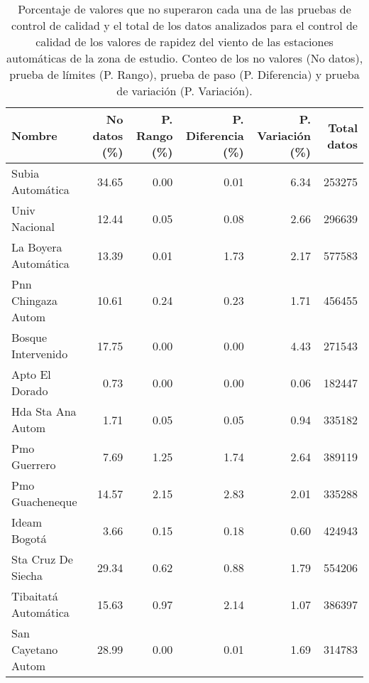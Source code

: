 \begin{table}[H]
\begin{center}

\caption{Porcentaje de valores que no superaron cada una de las pruebas de control de calidad y el total de los datos analizados para el control de calidad de los valores de rapidez del viento de las estaciones automáticas de la zona de estudio. Conteo de los no valores (No datos), prueba de límites (P. Rango), prueba de paso (P. Diferencia) y prueba de variación (P. Variación).}

\begin{tabular}{p{3cm}rrrrr}
\toprule
      Nombre &  No datos  (\%)&  P. Rango  (\%)&  P. Diferencia  (\%)&  P. Variación  (\%)& Total datos \\
\midrule
        Subia Automática &      34.65 &      0.00 &           0.01 &          6.34 &        253275 \\
           Univ Nacional &      12.44 &      0.05 &           0.08 &          2.66 &        296639 \\
    La Boyera Automática &      13.39 &      0.01 &           1.73 &          2.17 &        577583 \\
      Pnn Chingaza Autom &      10.61 &      0.24 &           0.23 &          1.71 &        456455 \\
      Bosque Intervenido &      17.75 &      0.00 &           0.00 &          4.43 &        271543 \\
          Apto El Dorado &       0.73 &      0.00 &           0.00 &          0.06 &        182447 \\
       Hda Sta Ana Autom &       1.71 &      0.05 &           0.05 &          0.94 &        335182 \\
            Pmo Guerrero &       7.69 &      1.25 &           1.74 &          2.64 &        389119 \\
         Pmo Guacheneque &      14.57 &      2.15 &           2.83 &          2.01 &        335288 \\
            Ideam Bogotá &       3.66 &      0.15 &           0.18 &          0.60 &        424943 \\
      Sta Cruz De Siecha &      29.34 &      0.62 &           0.88 &          1.79 &        554206 \\
    Tibaitatá Automática &      15.63 &      0.97 &           2.14 &          1.07 &        386397 \\
      San Cayetano Autom &      28.99 &      0.00 &           0.01 &          1.69 &        314783 \\

\end{tabular}
\end{center}
\end{table}
